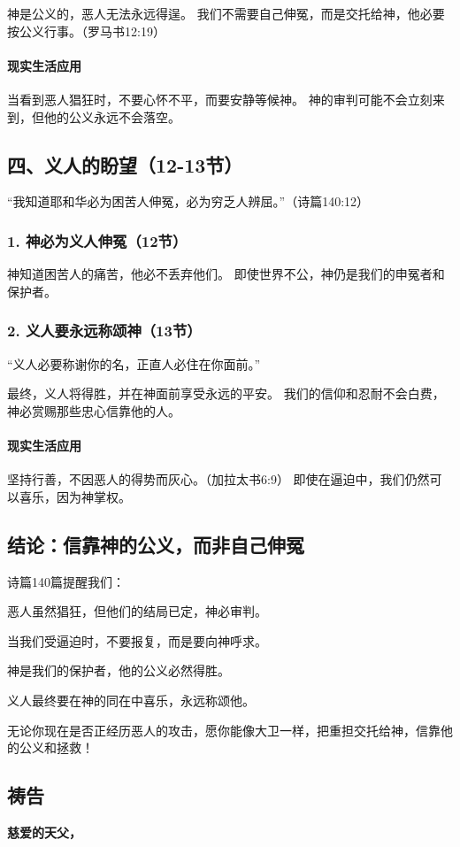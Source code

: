 \documentclass[a4paper, 12pt]{article}
\begin{document}
神是公义的，恶人无法永远得逞。
我们不需要自己伸冤，而是交托给神，他必要按公义行事。（罗马书12:19）
\paragraph*{现实生活应用}
当看到恶人猖狂时，不要心怀不平，而要安静等候神。
神的审判可能不会立刻来到，但他的公义永远不会落空。
\subsection*{四、义人的盼望（12-13节）}
“我知道耶和华必为困苦人伸冤，必为穷乏人辨屈。”（诗篇140:12）

\subsubsection*{1. 神必为义人伸冤（12节）}
神知道困苦人的痛苦，他必不丢弃他们。
即使世界不公，神仍是我们的申冤者和保护者。
\subsubsection*{2. 义人要永远称颂神（13节）}
“义人必要称谢你的名，正直人必住在你面前。”

最终，义人将得胜，并在神面前享受永远的平安。
我们的信仰和忍耐不会白费，神必赏赐那些忠心信靠他的人。
\paragraph*{现实生活应用}
坚持行善，不因恶人的得势而灰心。（加拉太书6:9）
即使在逼迫中，我们仍然可以喜乐，因为神掌权。
\subsection*{结论：信靠神的公义，而非自己伸冤}
诗篇140篇提醒我们：

恶人虽然猖狂，但他们的结局已定，神必审判。

当我们受逼迫时，不要报复，而是要向神呼求。

神是我们的保护者，他的公义必然得胜。

义人最终要在神的同在中喜乐，永远称颂他。

无论你现在是否正经历恶人的攻击，愿你能像大卫一样，把重担交托给神，信靠他的公义和拯救！

\subsection*{祷告}
\textbf{慈爱的天父，}
\end{document}
